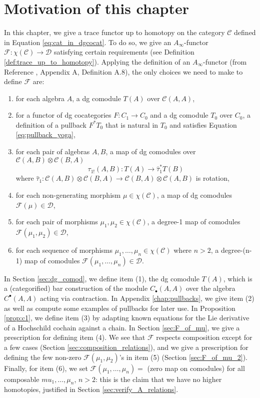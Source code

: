 \section{Motivation of this chapter}
In this chapter, we give a trace functor 
up to homotopy on the category $\mathcal{C}$ 
defined in Equation \ref{eq:cat_in_dgcocat}. 
To do so, we give an $A_\infty$-functor 
$\mathcal{F}: \chi(\mathcal{C}) \to 
\mathcal{D}$ satisfying 
certain requirements (see Definition 
\ref{def:trace_up_to_homotopy}). Applying 
the definition of an $A_\infty$-functor 
(from Reference \cite{F}, 
Appendix A, Definition A.8), the 
only choices we need to make to define 
$\mathcal{F}$ are:
\begin{enumerate}
	\item for each algebra $A$, 
	a dg comodule $T(A)$ over 
	$\mathcal{C}(A, A)$, 
	\item for a functor of dg cocategories 
	$F: C_1 \to C_0$ and a dg comodule $T_0$ over 
	$C_0$, a definition of a pullback 
	$F^*T_0$ that is natural in $T_0$ and satisfies 
	Equation \ref{eq:pullback_yoga},
	\item for each pair of algebras $A,B$, 
	a map of dg comodules over 
	$\mathcal{C}(A,B) \otimes \mathcal{C}(B,A)$
	$$\tau_{1!}(A,B):T(A) \to \hat{\tau}_1^* T(B)$$
	where $\hat{\tau}_1: \mathcal{C}(A,B) \otimes 
	\mathcal{C}(B,A) \to \mathcal{C}(B,A) \otimes 
	\mathcal{C}(A,B)$ is rotation,
	\item for each non-generating 
	morphism $\mu \in \chi(\mathcal{C})$, 
	a map of dg comodules $\mathcal{F}(\mu) \in 
	\mathcal{D}$,
	\item for each pair of morphisms $\mu_1, \mu_2 
	\in \chi(\mathcal{C})$, 
	a degree-1 map of comodules 
	$\mathcal{F}(\mu_1, \mu_2) \in 
	\mathcal{D}$, 
	\item for each sequence of morphisms 
	$\mu_1, \dots, \mu_n \in \chi(\mathcal{C})$ 
	where $n>2$, a degree-(n-1) map of comodules 
	$\mathcal{F}(\mu_1, \dots, \mu_n) \in 
	\mathcal{D}$.
\end{enumerate}
In Section \ref{sec:dg_comod}, we define item (1), the dg 
comodule $T(A)$, which is a (categorified) bar 
construction of the module $C_{\bullet}(A,A)$ over 
the algebra $C^\bullet(A,A)$ acting via contraction. 
In Appendix \ref{chap:pullbacks}, we give item (2) as well as 
compute some examples of pullbacks for later use. 
In Proposition \ref{prop:c1}, we define item (3) by 
adapting known equations for the Lie derivative of a 
Hochschild cochain against a chain. 
In Section \ref{sec:F_of_mu}, we give a prescription for 
defining item (4). We see that $\mathcal{F}$ 
respects composition except for a few cases 
(Section \ref{sec:composition_relations}), and 
we give a prescription for 
defining the few non-zero $\mathcal{F}(\mu_1, \mu_2)$'s 
in item (5) (Section \ref{sec:F_of_mu_2}). 
Finally, for item (6), we set 
$\mathcal{F}(\mu_1, \dots, \mu_n) = $ (zero map 
on comodules) for all composable $mu_1, \dots, \mu_n$, 
$n>2$: this is the claim that we have no higher 
homotopies, justified in Section \ref{sec:verify_A_relations}.